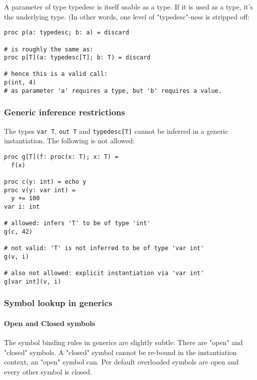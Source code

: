 A parameter of type {typedesc} is itself usable as a type. If it is used
as a type, it's the underlying type. (In other words, one level of
"typedesc"-ness is stripped off:

\begin{verbatim}
proc p(a: typedesc; b: a) = discard

# is roughly the same as:
proc p[T](a: typedesc[T]; b: T) = discard

# hence this is a valid call:
p(int, 4)
# as parameter 'a' requires a type, but 'b' requires a value.
\end{verbatim}

\hypertarget{generic-inference-restrictions}{%
\subsubsection{Generic inference
restrictions}\label{generic-inference-restrictions}}

The types \texttt{var\ T}, \texttt{out\ T} and \texttt{typedesc{[}T{]}}
cannot be inferred in a generic instantiation. The following is not
allowed:

\begin{verbatim}
proc g[T](f: proc(x: T); x: T) =
  f(x)

proc c(y: int) = echo y
proc v(y: var int) =
  y += 100
var i: int

# allowed: infers 'T' to be of type 'int'
g(c, 42)

# not valid: 'T' is not inferred to be of type 'var int'
g(v, i)

# also not allowed: explicit instantiation via 'var int'
g[var int](v, i)
\end{verbatim}

\hypertarget{symbol-lookup-in-generics}{%
\subsubsection{Symbol lookup in
generics}\label{symbol-lookup-in-generics}}

\hypertarget{open-and-closed-symbols}{%
\paragraph{Open and Closed symbols}\label{open-and-closed-symbols}}

The symbol binding rules in generics are slightly subtle: There are
"open" and "closed" symbols. A "closed" symbol cannot be re-bound in the
instantiation context, an "open" symbol can. Per default overloaded
symbols are open and every other symbol is closed.

